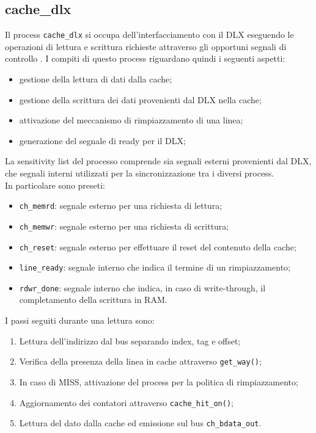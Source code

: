 \subsection{cache\_dlx}

Il process \texttt{cache\_dlx} si occupa dell'interfacciamento con il DLX eseguendo le operazioni di lettura e scrittura richieste attraverso gli opportuni segnali di controllo .
I compiti di questo process riguardano quindi i seguenti aspetti:
\begin{itemize}
  \item gestione della lettura di dati dalla cache;
  \item gestione della scrittura dei dati provenienti dal DLX nella cache;
  \item attivazione del meccanismo di rimpiazzamento di una linea;
  \item generazione del segnale di ready per il DLX;
\end{itemize}

La sensitivity list del processo comprende sia segnali esterni provenienti dal DLX, che segnali interni utilizzati per la sincronizzazione tra i diversi process.\\
In particolare sono preseti:
\begin{itemize}
  \item \texttt{ch\_memrd}: segnale esterno per una richiesta di lettura;
  \item \texttt{ch\_memwr}: segnale esterno per una richiesta di scrittura;
  \item \texttt{ch\_reset}: segnale esterno per effettuare il reset del contenuto della cache;
  \item \texttt{line\_ready}: segnale interno che indica il termine di un rimpiazzamento;
  \item \texttt{rdwr\_done}: segnale interno che indica, in caso di write-through, il completamento della scrittura in RAM.
\end{itemize}
 
I passi seguiti durante una lettura sono:
\begin{enumerate}
  \item Lettura dell'indirizzo dal bus separando index, tag e offset;
  \item Verifica della presenza della linea in cache attraverso \texttt{get\_way()};
  \item In caso di MISS, attivazione del process per la politica di rimpiazzamento;
  \item Aggiornamento dei contatori attraverso \texttt{cache\_hit\_on()};
  \item Lettura del dato dalla cache ed emissione sul bus \texttt{ch\_bdata\_out}.
\end{enumerate}	

